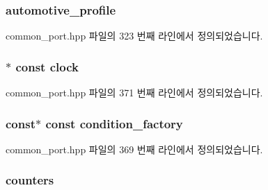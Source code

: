 \subsubsection[{\texorpdfstring{automotive\+\_\+profile}{automotive_profile}}]{ automotive\+\_\+profile\hspace{0.3cm}{\ttfamily [private]}}\hypertarget{class_common_port_a915ce34888736844c056a811c96a9e9f}{}\label{class_common_port_a915ce34888736844c056a811c96a9e9f}


common\+\_\+port.\+hpp 파일의 323 번째 라인에서 정의되었습니다.

\subsubsection[{\texorpdfstring{clock}{clock}}]{$\ast$ const clock\hspace{0.3cm}{\ttfamily [protected]}}\hypertarget{class_common_port_aa2bc8731fa5aeb5b033feebc2b67258c}{}\label{class_common_port_aa2bc8731fa5aeb5b033feebc2b67258c}


common\+\_\+port.\+hpp 파일의 371 번째 라인에서 정의되었습니다.

\subsubsection[{\texorpdfstring{condition\+\_\+factory}{condition_factory}}]{ const$\ast$ const condition\+\_\+factory\hspace{0.3cm}{\ttfamily [protected]}}\hypertarget{class_common_port_a91ea953f424f90ddff06dc5a6fa00fb1}{}\label{class_common_port_a91ea953f424f90ddff06dc5a6fa00fb1}


common\+\_\+port.\+hpp 파일의 369 번째 라인에서 정의되었습니다.

\subsubsection[{\texorpdfstring{counters}{counters}}]{ counters\hspace{0.3cm}{\ttfamily [private]}}\hypertarget{class_common_port_aa7b0659a6104355b95878f69b0aefb69}{}\label{class_common_port_aa7b0659a6104355b95878f69b0aefb69}


